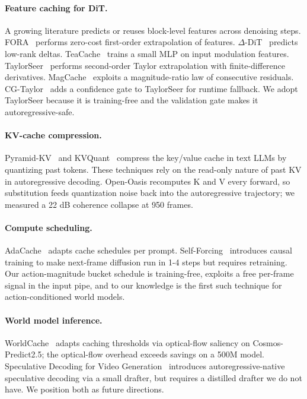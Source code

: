 \documentclass[10pt,letterpaper,twocolumn]{article}
\begin{document}
\paragraph{Feature caching for DiT.} A growing literature predicts or reuses block-level features across denoising steps. FORA~\citep{selvaraju2024fora} performs zero-cost first-order extrapolation of features. $\Delta$-DiT~\citep{chen2024deltadit} predicts low-rank deltas. TeaCache~\citep{liu2024teacache} trains a small MLP on input modulation features. TaylorSeer~\citep{zhang2025taylorseer} performs second-order Taylor extrapolation with finite-difference derivatives. MagCache~\citep{gao2025magcache} exploits a magnitude-ratio law of consecutive residuals. CG-Taylor~\citep{yu2025cgtaylor} adds a confidence gate to TaylorSeer for runtime fallback. We adopt TaylorSeer because it is training-free and the validation gate makes it autoregressive-safe.

\paragraph{KV-cache compression.} Pyramid-KV~\citep{cai2024pyramidkv} and KVQuant~\citep{liu2024kvquant} compress the key/value cache in text LLMs by quantizing past tokens. These techniques rely on the read-only nature of past KV in autoregressive decoding. Open-Oasis recomputes K and V every forward, so substitution feeds quantization noise back into the autoregressive trajectory; we measured a 22 dB coherence collapse at 950 frames.

\paragraph{Compute scheduling.} AdaCache~\citep{nvidia2024adacache} adapts cache schedules per prompt. Self-Forcing~\citep{xu2025selfforcing} introduces causal training to make next-frame diffusion run in 1-4 steps but requires retraining. Our action-magnitude bucket schedule is training-free, exploits a free per-frame signal in the input pipe, and to our knowledge is the first such technique for action-conditioned world models.

\paragraph{World model inference.} WorldCache~\citep{world2026worldcache} adapts caching thresholds via optical-flow saliency on Cosmos-Predict2.5; the optical-flow overhead exceeds savings on a 500M model. Speculative Decoding for Video Generation~\citep{sdvg2026} introduces autoregressive-native speculative decoding via a small drafter, but requires a distilled drafter we do not have. We position both as future directions.
\end{document}
